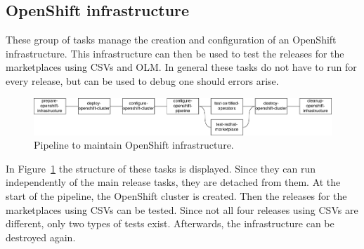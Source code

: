 \subsection{OpenShift infrastructure}\label{subsec:openshift-infrastructure}

These group of tasks manage the creation and configuration of an OpenShift infrastructure.
This infrastructure can then be used to test the releases for the marketplaces using CSVs and OLM.
In general these tasks do not have to run for every release, but can be used to debug one should errors arise.

\begin{figure}[H]
    \centering
    \includegraphics[width=\textwidth]{img/implementation/openshift}
    \caption{Pipeline to maintain OpenShift infrastructure.}
    \label{fig:pipeline-to-maintain-openshift-infrastructure}
\end{figure}

In Figure~\ref{fig:pipeline-to-maintain-openshift-infrastructure} the structure of these tasks is displayed.
Since they can run independently of the main release tasks, they are detached from them.
At the start of the pipeline, the OpenShift cluster is created.
Then the releases for the marketplaces using CSVs can be tested.
Since not all four releases using CSVs are different, only two types of tests exist.
Afterwards, the infrastructure can be destroyed again.







\pagebreak



\pagebreak







